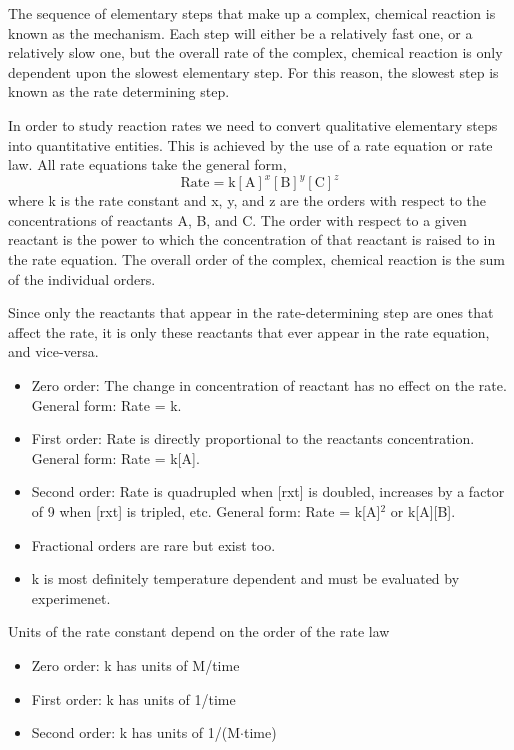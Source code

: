 \documentclass[../chem.tex]{subfiles}
\begin{document}
The sequence of elementary steps that make up a complex, chemical reaction is known as the mechanism. Each step will either be a relatively fast one, 
or a relatively slow one, but the overall rate of the complex, chemical reaction is only dependent upon the slowest elementary step. For this reason, the 
slowest step is known as the rate determining step.

In order to study reaction rates we need to convert qualitative elementary steps into quantitative entities. This is achieved by the use of a 
rate equation or rate law. All rate equations take the general form,
\[\text{Rate}=\text{k}[\text{A}]^x[\text{B}]^y[\text{C}]^z\]
where k is the rate constant and x, y, and z are the orders with respect to the concentrations of reactants A, B, and C. The order with respect 
to a given reactant is the power to which the concentration of that reactant is raised to in the rate equation. The overall order of the complex, chemical 
reaction is the sum of the individual orders.

Since only the reactants that appear in the rate-determining step are ones that affect the rate, it is only these reactants that ever appear in the rate equation, and vice-versa.

\begin{itemize}
    \item Zero order: The change in concentration of reactant has no effect on the rate. General form: Rate = k.
    \item First order: Rate is directly proportional to the reactants concentration. General form: Rate = k[A].
    \item Second order: Rate is quadrupled when [rxt] is doubled, increases by a factor of 9 when [rxt] is tripled, etc. General form: Rate = k[A]$^2$ or k[A][B].
    \item Fractional orders are rare but exist too.
\end{itemize}

\begin{itemize}
    \item k is most definitely temperature dependent and must be evaluated by experimenet.
\end{itemize}

Units of the rate constant depend on the order of the rate law
\begin{itemize}
    \item Zero order: k has units of M/time 
    \item First order: k has units of 1/time 
    \item Second order: k has units of 1/(M$\cdot$time)
\end{itemize}
\end{document}
